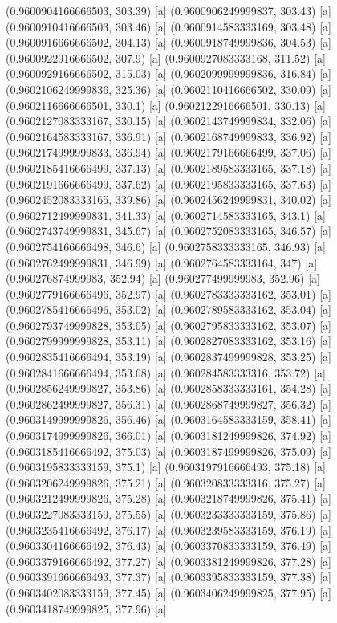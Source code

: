 {{{(0.9600904166666503, 303.39) [a] 
(0.9600906249999837, 303.43) [a] 
(0.9600910416666503, 303.46) [a] 
(0.9600914583333169, 303.48) [a] 
(0.9600916666666502, 304.13) [a] 
(0.9600918749999836, 304.53) [a] 
(0.9600922916666502, 307.9) [a] 
(0.9600927083333168, 311.52) [a] 
(0.9600929166666502, 315.03) [a] 
(0.9602099999999836, 316.84) [a] 
(0.9602106249999836, 325.36) [a] 
(0.9602110416666502, 330.09) [a] 
(0.9602116666666501, 330.1) [a] 
(0.9602122916666501, 330.13) [a] 
(0.9602127083333167, 330.15) [a] 
(0.9602143749999834, 332.06) [a] 
(0.9602164583333167, 336.91) [a] 
(0.9602168749999833, 336.92) [a] 
(0.9602174999999833, 336.94) [a] 
(0.9602179166666499, 337.06) [a] 
(0.9602185416666499, 337.13) [a] 
(0.9602189583333165, 337.18) [a] 
(0.9602191666666499, 337.62) [a] 
(0.9602195833333165, 337.63) [a] 
(0.9602452083333165, 339.86) [a] 
(0.9602456249999831, 340.02) [a] 
(0.9602712499999831, 341.33) [a] 
(0.9602714583333165, 343.1) [a] 
(0.9602743749999831, 345.67) [a] 
(0.9602752083333165, 346.57) [a] 
(0.9602754166666498, 346.6) [a] 
(0.9602758333333165, 346.93) [a] 
(0.9602762499999831, 346.99) [a] 
(0.9602764583333164, 347) [a] 
(0.960276874999983, 352.94) [a] 
(0.960277499999983, 352.96) [a] 
(0.9602779166666496, 352.97) [a] 
(0.9602783333333162, 353.01) [a] 
(0.9602785416666496, 353.02) [a] 
(0.9602789583333162, 353.04) [a] 
(0.9602793749999828, 353.05) [a] 
(0.9602795833333162, 353.07) [a] 
(0.9602799999999828, 353.11) [a] 
(0.9602827083333162, 353.16) [a] 
(0.9602835416666494, 353.19) [a] 
(0.9602837499999828, 353.25) [a] 
(0.9602841666666494, 353.68) [a] 
(0.960284583333316, 353.72) [a] 
(0.9602856249999827, 353.86) [a] 
(0.9602858333333161, 354.28) [a] 
(0.9602862499999827, 356.31) [a] 
(0.9602868749999827, 356.32) [a] 
(0.9603149999999826, 356.46) [a] 
(0.9603164583333159, 358.41) [a] 
(0.9603174999999826, 366.01) [a] 
(0.9603181249999826, 374.92) [a] 
(0.9603185416666492, 375.03) [a] 
(0.9603187499999826, 375.09) [a] 
(0.9603195833333159, 375.1) [a] 
(0.9603197916666493, 375.18) [a] 
(0.9603206249999826, 375.21) [a] 
(0.960320833333316, 375.27) [a] 
(0.9603212499999826, 375.28) [a] 
(0.9603218749999826, 375.41) [a] 
(0.9603227083333159, 375.55) [a] 
(0.9603233333333159, 375.86) [a] 
(0.9603235416666492, 376.17) [a] 
(0.9603239583333159, 376.19) [a] 
(0.9603304166666492, 376.43) [a] 
(0.9603370833333159, 376.49) [a] 
(0.9603379166666492, 377.27) [a] 
(0.9603381249999826, 377.28) [a] 
(0.9603391666666493, 377.37) [a] 
(0.9603395833333159, 377.38) [a] 
(0.9603402083333159, 377.45) [a] 
(0.9603406249999825, 377.95) [a] 
(0.9603418749999825, 377.96) [a] 
}}}
